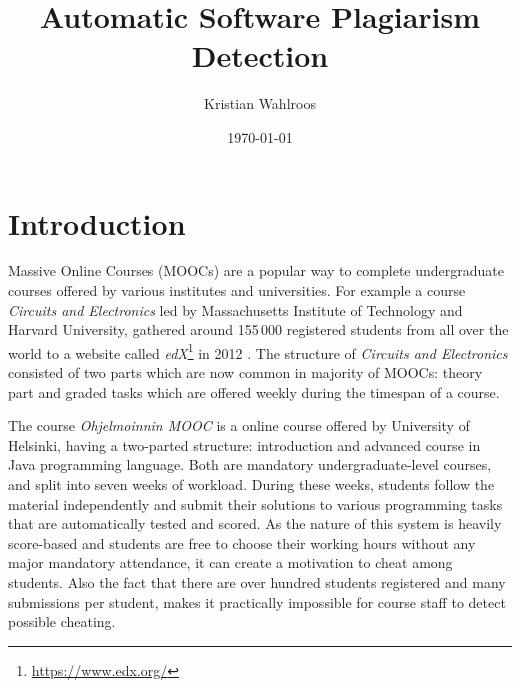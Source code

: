 \documentclass[english, grading]{tktltiki2}
\title{Automatic Software Plagiarism Detection}
\author{Kristian Wahlroos}
\date{\today}
\theoremstyle{definition}
\theoremstyle{remark}
\numberwithin{equation}{section} %
\begin{document}

\frontmatter      %

\maketitle        %
\makeabstract     %

\tableofcontents  %


\mainmatter       %

\section{Introduction}


Massive Online Courses (MOOCs) are a popular way to complete undergraduate courses offered by various institutes and universities. For example a course \emph{Circuits and Electronics} led by Massachusetts Institute of Technology and Harvard University, gathered around 155\,000 registered students from all over the world to a website called \emph{edX}\footnote{\url{https://www.edx.org/}} in 2012 \cite{SLWCRFM2013}. The structure of \emph{Circuits and Electronics} consisted of two parts which are now common in majority of MOOCs: theory part and graded tasks which are offered weekly during the timespan of a course. 

The course \emph{Ohjelmoinnin MOOC} is a online course offered by University of Helsinki, having a two-parted structure: introduction and advanced course in Java programming language. Both are mandatory undergraduate-level courses, and split into seven weeks of workload. During these weeks, students follow the material independently and submit their solutions to various programming tasks that are automatically tested and scored. As the nature of this system is heavily score-based and students are free to choose their working hours without any major mandatory attendance, it can create a motivation to cheat among  students. Also the fact that there are over hundred students registered and many submissions per student, makes it practically impossible for course staff to detect possible cheating. 
\end{document}
